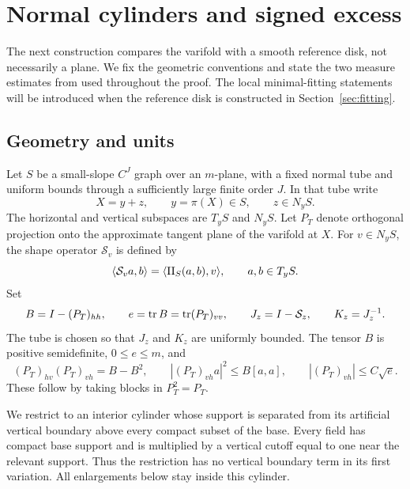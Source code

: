 \section{Normal cylinders and signed excess}\label{sec:normal-inputs}

The next construction compares the varifold with a smooth reference disk,
not necessarily a plane. We fix the geometric conventions and state the
two measure estimates from \cite{AE} used throughout the proof. The local
minimal-fitting statements will be introduced when the reference disk is
constructed in Section~\ref{sec:fitting}.

\subsection{Geometry and units}
Let $S$ be a small-slope $C^J$ graph over an $m$-plane, with a fixed normal
tube and uniform bounds through a sufficiently large finite order $J$.
In that tube write
\[
 X=y+z,\qquad y=\pi(X)\in S,\qquad z\in N_yS.
\]
The horizontal and vertical subspaces are $T_yS$ and $N_yS$. Let $P_T$
denote orthogonal projection onto the approximate tangent plane of the
varifold at $X$. For $v\in N_yS$, the shape operator $\mathcal S_v$ is
defined by
\[
 \langle\mathcal S_v a,b\rangle
   =\langle\mathrm{II}_S(a,b),v\rangle,
 \qquad a,b\in T_yS.
\]
Set
\begin{equation}\label{eq:normal-tensors}
 B=I-(P_T)_{hh},\qquad e=\operatorname{tr} B=\operatorname{tr}(P_T)_{vv},
 \qquad J_z=I-\mathcal S_z,\qquad K_z=J_z^{-1}.
\end{equation}
The tube is chosen so that $J_z$ and $K_z$ are uniformly bounded.
The tensor $B$ is positive semidefinite, $0\le e\le m$, and
\begin{equation}\label{eq:projection-blocks}
 (P_T)_{hv}(P_T)_{vh}=B-B^2,
 \qquad |(P_T)_{vh}a|^2\le B[a,a],
 \qquad |(P_T)_{vh}|\le C\sqrt e.
\end{equation}
These follow by taking blocks in $P_T^2=P_T$.

We restrict to an interior cylinder whose support is separated from its
artificial vertical boundary above every compact subset of the base.
Every field has compact base support and is multiplied by a vertical
cutoff equal to one near the relevant support. Thus the restriction has
no vertical boundary term in its first variation. All enlargements below
stay inside this cylinder.

